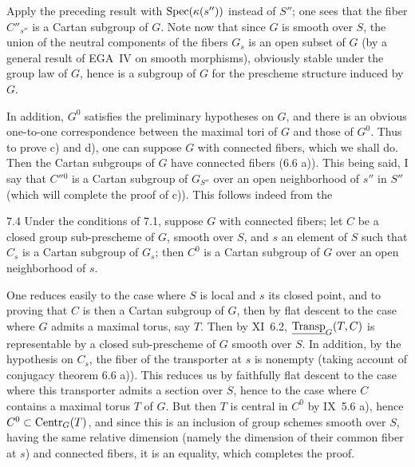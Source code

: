 Apply the preceding result with $\operatorname{Spec}(\kappa(s''))$ instead of $S''$; one sees that the fiber $C''_{s''}$ is a Cartan subgroup of $G$. Note now that since $G$ is smooth over $S$, the union of the neutral components of the fibers $G_s$ is an open subset of $G$ (by a general result of EGA~IV on smooth morphisms), obviously stable under the group law of $G$, hence is a subgroup of $G$ for the prescheme structure induced by $G$.

In addition, $G^0$ satisfies the preliminary hypotheses on $G$, and there is an obvious one-to-one correspondence between the maximal tori of $G$ and those of $G^0$. Thus to prove c) and d), one can suppose $G$ with connected fibers, which we shall do. Then the Cartan subgroups of $G$ have connected fibers (6.6 a)). This being said, I say that $C''{}^0$ is a Cartan subgroup of $G_{S''}$ over an open neighborhood of $s''$ in $S''$ (which will complete the proof of c)). This follows indeed from the
\begin{lemma}{7.4}\label{XII.7.4}
Under the conditions of 7.1, suppose $G$ with connected fibers; let $C$ be a closed group sub-prescheme of $G$, smooth over $S$, and $s$ an element of $S$ such that $C_s$ is a Cartan subgroup of $G_s$; then $C^0$ is a Cartan subgroup of $G$ over an open neighborhood of $s$.
\end{lemma}
One reduces easily to the case where $S$ is local and $s$ its closed point, and to proving that $C$ is then a Cartan subgroup of $G$, then by flat descent to the case where $G$ admits a maximal torus, say $T$. Then by XI~6.2, $\underline{\operatorname{Transp}}_G(T,C)$ is representable by a closed sub-prescheme of $G$ smooth over $S$. In addition, by the hypothesis on $C_s$, the fiber of the transporter at $s$ is nonempty (taking account of conjugacy theorem 6.6 a)). This reduces us by faithfully flat descent to the case where this transporter admits a section over $S$, hence to the case where $C$ contains a maximal torus $T$ of $G$. But then $T$ is central in $C^0$ by IX~5.6 a), hence $C^0\subset\operatorname{Centr}_G(T)$, and since this is an inclusion of group schemes smooth over $S$, having the same relative dimension (namely the dimension of their common fiber at $s$) and connected fibers, it is an equality, which completes the proof.

